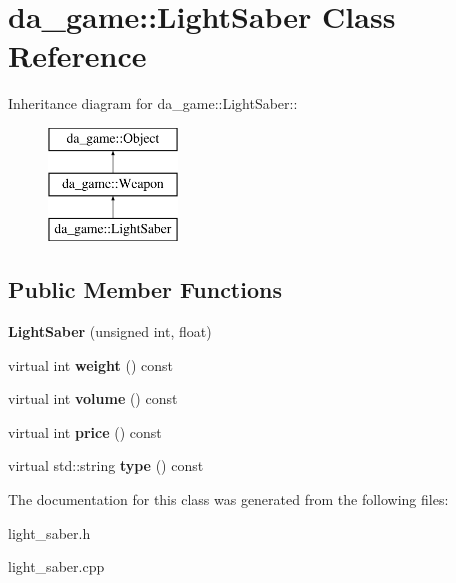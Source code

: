 \hypertarget{classda__game_1_1LightSaber}{
\section{da\_\-game::LightSaber Class Reference}
\label{classda__game_1_1LightSaber}
}
Inheritance diagram for da\_\-game::LightSaber::\begin{figure}[H]
\begin{center}
\leavevmode
\includegraphics[height=3cm]{classda__game_1_1LightSaber}
\end{center}
\end{figure}
\subsection*{Public Member Functions}
\begin{DoxyCompactItemize}
\item 
\hypertarget{classda__game_1_1LightSaber_a4008857749873e2a2cd3bc8258e05741}{
{\bfseries LightSaber} (unsigned int, float)}
\label{classda__game_1_1LightSaber_a4008857749873e2a2cd3bc8258e05741}

\item 
\hypertarget{classda__game_1_1LightSaber_aa4ca392fb17a006df70176045e36ba4d}{
virtual int {\bfseries weight} () const }
\label{classda__game_1_1LightSaber_aa4ca392fb17a006df70176045e36ba4d}

\item 
\hypertarget{classda__game_1_1LightSaber_ab2883eb294fb19ac5bbb9c5215f1cfd5}{
virtual int {\bfseries volume} () const }
\label{classda__game_1_1LightSaber_ab2883eb294fb19ac5bbb9c5215f1cfd5}

\item 
\hypertarget{classda__game_1_1LightSaber_a2ddf499cbf92bb6456beac3b4b6bcd64}{
virtual int {\bfseries price} () const }
\label{classda__game_1_1LightSaber_a2ddf499cbf92bb6456beac3b4b6bcd64}

\item 
\hypertarget{classda__game_1_1LightSaber_ac69f6a976779c9c16d48ee7637a4a8db}{
virtual std::string {\bfseries type} () const }
\label{classda__game_1_1LightSaber_ac69f6a976779c9c16d48ee7637a4a8db}

\end{DoxyCompactItemize}


The documentation for this class was generated from the following files:\begin{DoxyCompactItemize}
\item 
light\_\-saber.h\item 
light\_\-saber.cpp\end{DoxyCompactItemize}
